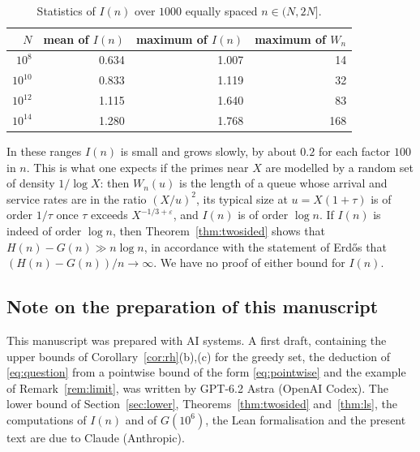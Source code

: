 \documentclass[11pt,reqno]{amsart}
\theoremstyle{definition}
\theoremstyle{remark}
\numberwithin{equation}{section}
\newcommand{\eps}{\varepsilon}
\begin{document}
\begin{table}[ht]
\centering
\begin{tabular}{rrrr}
\toprule
$N$ & mean of $I(n)$ & maximum of $I(n)$ & maximum of $W_n$\\
\midrule
$10^{8}$ & 0.634 & 1.007 & 14\\
$10^{10}$ & 0.833 & 1.119 & 32\\
$10^{12}$ & 1.115 & 1.640 & 83\\
$10^{14}$ & 1.280 & 1.768 & 168\\
\bottomrule
\end{tabular}
\medskip
\caption{Statistics of $I(n)$ over $1000$ equally spaced $n\in(N,2N]$.}\label{tab:sample}
\end{table}

In these ranges $I(n)$ is small and grows slowly, by about $0.2$ for each factor $100$ in $n$. This is what one expects if the primes near $X$ are modelled by a random set of density $1/\log X$: then $W_n(u)$ is the length of a queue whose arrival and service rates are in the ratio $(X/u)^2$, its typical size at $u=X(1+\tau)$ is of order $1/\tau$ once $\tau$ exceeds $X^{-1/3+\eps}$, and $I(n)$ is of order $\log n$. If $I(n)$ is indeed of order $\log n$, then Theorem~\ref{thm:twosided} shows that $H(n)-G(n)\gg n\log n$, in accordance with the statement of Erd\H{o}s \cite{Er84} that $(H(n)-G(n))/n\to\infty$. We have no proof of either bound for $I(n)$.

\subsection*{Note on the preparation of this manuscript}
This manuscript was prepared with AI systems. A first draft, containing the upper bounds of Corollary~\ref{cor:rh}(b),(c) for the greedy set, the deduction of \eqref{eq:question} from a pointwise bound of the form \eqref{eq:pointwise} and the example of Remark~\ref{rem:limit}, was written by GPT-6.2 Astra (OpenAI Codex). The lower bound of Section~\ref{sec:lower}, Theorems~\ref{thm:twosided} and~\ref{thm:ls}, the computations of $I(n)$ and of $G(10^6)$, the Lean formalisation and the present text are due to Claude (Anthropic).
\end{document}
